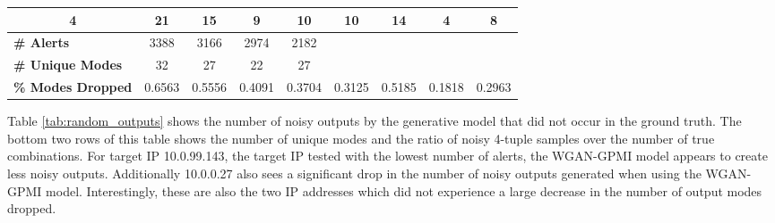 \begin{table}[!htbp]
\begin{adjustbox}{angle=90}
\begin{tabular}{ccccccccc}
			\multicolumn{1}{c|}{\textbf{4}} & \multicolumn{1}{c|}{21} & \multicolumn{1}{c|}{15} & \multicolumn{1}{c|}{9} & \multicolumn{1}{c|}{10} & \multicolumn{1}{c|}{10} & \multicolumn{1}{c|}{14} & \multicolumn{1}{c|}{4} & 8 \\ \hline
			\hline
			
			\multicolumn{1}{l|}{\textbf{\# Alerts}} & \multicolumn{1}{c|}{3388} & \multicolumn{1}{c|}{3166} & \multicolumn{1}{c|}{2974} & \multicolumn{1}{c|}{2182} & \multicolumn{1}{l|}{} & \multicolumn{1}{l|}{} & \multicolumn{1}{l|}{} & \multicolumn{1}{l}{} \\
			\multicolumn{1}{l|}{\textbf{\# Unique Modes}} & \multicolumn{1}{c|}{32} & \multicolumn{1}{c|}{27} & \multicolumn{1}{c|}{22} & \multicolumn{1}{c|}{27} & \multicolumn{1}{l|}{} & \multicolumn{1}{l|}{} & \multicolumn{1}{l|}{} & \multicolumn{1}{l}{} \\
			\multicolumn{1}{l|}{\textbf{\% Modes Dropped}} & \multicolumn{1}{c|}{0.6563} & \multicolumn{1}{c|}{0.5556} & \multicolumn{1}{c|}{0.4091} & 
			\multicolumn{1}{c|}{0.3704} & \multicolumn{1}{c|}{0.3125} & \multicolumn{1}{c|}{0.5185} & \multicolumn{1}{c|}{0.1818} & \multicolumn{1}{c}{0.2963}
		\end{tabular}
	\end{adjustbox}
\end{table}

Table \ref{tab:random_outputs} shows the number of noisy outputs by the generative model that did not occur in the ground truth. The bottom two rows of this table shows the number of unique modes and the ratio of noisy 4-tuple samples over the number of true combinations.  For target IP 10.0.99.143, the target IP tested with the lowest number of alerts, the WGAN-GPMI model appears to create less noisy outputs. Additionally 10.0.0.27 also sees a significant drop in the number of noisy outputs generated when using the WGAN-GPMI model. Interestingly, these are also the two IP addresses which did not experience a large decrease in the number of output modes dropped.

